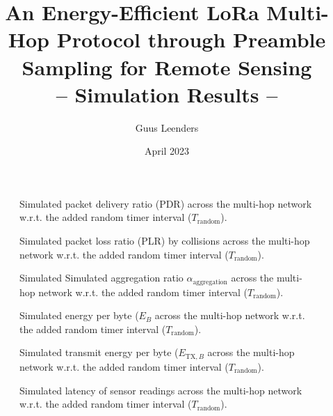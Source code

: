 \documentclass{article}
\title{An Energy-Efficient LoRa Multi-Hop Protocol through
Preamble Sampling for Remote Sensing \\[1ex] \large -- Simulation Results --}
\author{Guus Leenders}
\date{April 2023}
\newcommand{\multihop}{multi-hop\xspace}
\begin{document}
\maketitle


\FloatBarrier
\begin{figure}[p]
    \centering
    
    \vspace{-0.7cm}
    \caption{Simulated packet delivery ratio (PDR) across the \multihop network w.r.t. the added random timer interval ($T_\text{random}$).}
    \label{fig:}
\end{figure}
\begin{figure}[p]
    \centering
    
    \vspace{-0.7cm}
    \caption{Simulated packet loss ratio (PLR) by collisions across the \multihop network w.r.t. the added random timer interval ($T_\text{random}$).}
    \label{fig:}
\end{figure}
\begin{figure}[p]
    \centering
    
    \vspace{-0.7cm}
    \caption{Simulated Simulated aggregation ratio $\alpha_\text{aggregation}$ across the \multihop network w.r.t. the added random timer interval ($T_\text{random}$).}
    \label{fig:}
\end{figure}
\begin{figure}[p]
    \centering
    
    \vspace{-0.7cm}
    \caption{Simulated energy per byte ($E_B$ across the \multihop network w.r.t. the added random timer interval ($T_\text{random}$).}
    \label{fig:}
\end{figure}
\begin{figure}[p]
    \centering
    
    \vspace{-0.7cm}
    \caption{Simulated transmit energy per byte ($E_{\text{TX}, B}$ across the \multihop network w.r.t. the added random timer interval ($T_\text{random}$).}
    \label{fig:}
\end{figure}
\begin{figure}[p]
    \centering
    
    \vspace{-0.7cm}
    \caption{Simulated latency of sensor readings across the \multihop network w.r.t. the added random timer interval ($T_\text{random}$).}
    \label{fig:}
\end{figure}
\end{document}
